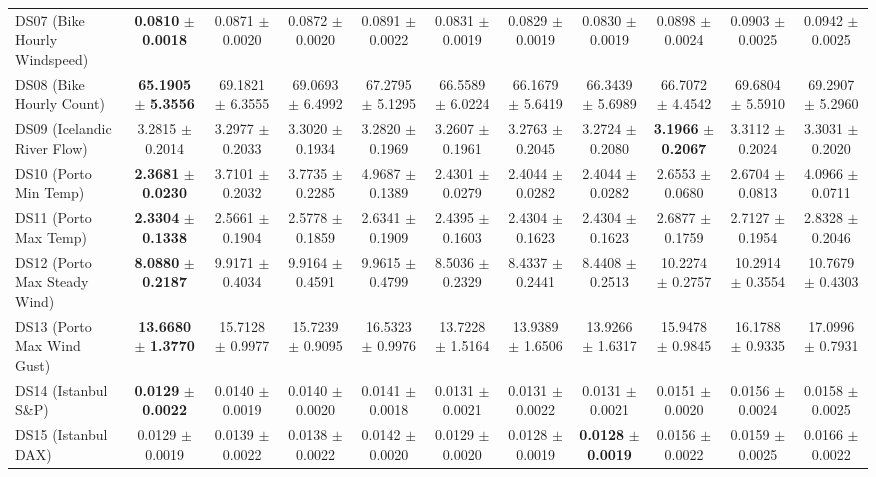 \begin{table}[t]
{{\begin{tabular}{lcccccccccc}
DS07 (Bike Hourly Windspeed) & \textbf{0.0810} $\pm$ \textbf{0.0018} & 0.0871 $\pm$ 0.0020 & 0.0872 $\pm$ 0.0020 & 0.0891 $\pm$ 0.0022 & 0.0831 $\pm$ 0.0019 & 0.0829 $\pm$ 0.0019 & 0.0830 $\pm$ 0.0019 & 0.0898 $\pm$ 0.0024 & 0.0903 $\pm$ 0.0025 & 0.0942 $\pm$ 0.0025 \\
DS08 (Bike Hourly Count) & \textbf{65.1905} $\pm$ \textbf{5.3556} & 69.1821 $\pm$ 6.3555 & 69.0693 $\pm$ 6.4992 & 67.2795 $\pm$ 5.1295 & 66.5589 $\pm$ 6.0224 & 66.1679 $\pm$ 5.6419 & 66.3439 $\pm$ 5.6989 & 66.7072 $\pm$ 4.4542 & 69.6804 $\pm$ 5.5910 & 69.2907 $\pm$ 5.2960 \\
DS09 (Icelandic River Flow) & 3.2815 $\pm$ 0.2014 & 3.2977 $\pm$ 0.2033 & 3.3020 $\pm$ 0.1934 & 3.2820 $\pm$ 0.1969 & 3.2607 $\pm$ 0.1961 & 3.2763 $\pm$ 0.2045 & 3.2724 $\pm$ 0.2080 & \textbf{3.1966} $\pm$ \textbf{0.2067} & 3.3112 $\pm$ 0.2024 & 3.3031 $\pm$ 0.2020 \\
DS10 (Porto Min Temp) & \textbf{2.3681} $\pm$ \textbf{0.0230} & 3.7101 $\pm$ 0.2032 & 3.7735 $\pm$ 0.2285 & 4.9687 $\pm$ 0.1389 & 2.4301 $\pm$ 0.0279 & 2.4044 $\pm$ 0.0282 & 2.4044 $\pm$ 0.0282 & 2.6553 $\pm$ 0.0680 & 2.6704 $\pm$ 0.0813 & 4.0966 $\pm$ 0.0711 \\
DS11 (Porto Max Temp) & \textbf{2.3304} $\pm$ \textbf{0.1338} & 2.5661 $\pm$ 0.1904 & 2.5778 $\pm$ 0.1859 & 2.6341 $\pm$ 0.1909 & 2.4395 $\pm$ 0.1603 & 2.4304 $\pm$ 0.1623 & 2.4304 $\pm$ 0.1623 & 2.6877 $\pm$ 0.1759 & 2.7127 $\pm$ 0.1954 & 2.8328 $\pm$ 0.2046 \\
DS12 (Porto Max Steady Wind) & \textbf{8.0880} $\pm$ \textbf{0.2187} & 9.9171 $\pm$ 0.4034 & 9.9164 $\pm$ 0.4591 & 9.9615 $\pm$ 0.4799 & 8.5036 $\pm$ 0.2329 & 8.4337 $\pm$ 0.2441 & 8.4408 $\pm$ 0.2513 & 10.2274 $\pm$ 0.2757 & 10.2914 $\pm$ 0.3554 & 10.7679 $\pm$ 0.4303 \\
DS13 (Porto Max Wind Gust) & \textbf{13.6680} $\pm$ \textbf{1.3770} & 15.7128 $\pm$ 0.9977 & 15.7239 $\pm$ 0.9095 & 16.5323 $\pm$ 0.9976 & 13.7228 $\pm$ 1.5164 & 13.9389 $\pm$ 1.6506 & 13.9266 $\pm$ 1.6317 & 15.9478 $\pm$ 0.9845 & 16.1788 $\pm$ 0.9335 & 17.0996 $\pm$ 0.7931 \\
DS14 (Istanbul S\&P) & \textbf{0.0129} $\pm$ \textbf{0.0022} & 0.0140 $\pm$ 0.0019 & 0.0140 $\pm$ 0.0020 & 0.0141 $\pm$ 0.0018 & 0.0131 $\pm$ 0.0021 & 0.0131 $\pm$ 0.0022 & 0.0131 $\pm$ 0.0021 & 0.0151 $\pm$ 0.0020 & 0.0156 $\pm$ 0.0024 & 0.0158 $\pm$ 0.0025 \\
DS15 (Istanbul DAX) & 0.0129 $\pm$ 0.0019 & 0.0139 $\pm$ 0.0022 & 0.0138 $\pm$ 0.0022 & 0.0142 $\pm$ 0.0020 & 0.0129 $\pm$ 0.0020 & 0.0128 $\pm$ 0.0019 & \textbf{0.0128} $\pm$ \textbf{0.0019} & 0.0156 $\pm$ 0.0022 & 0.0159 $\pm$ 0.0025 & 0.0166 $\pm$ 0.0022 \\

\end{tabular}}}
\end{table}
